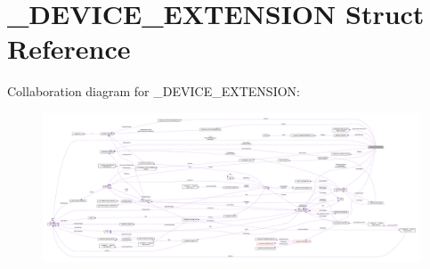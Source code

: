 \hypertarget{struct__DEVICE__EXTENSION}{}\section{\+\_\+\+D\+E\+V\+I\+C\+E\+\_\+\+E\+X\+T\+E\+N\+S\+I\+O\+N Struct Reference}
\label{struct__DEVICE__EXTENSION}


Collaboration diagram for \+\_\+\+D\+E\+V\+I\+C\+E\+\_\+\+E\+X\+T\+E\+N\+S\+I\+O\+N\+:
\nopagebreak
\begin{figure}[H]
\begin{center}
\leavevmode
\includegraphics[width=350pt]{struct__DEVICE__EXTENSION__coll__graph}
\end{center}
\end{figure}
